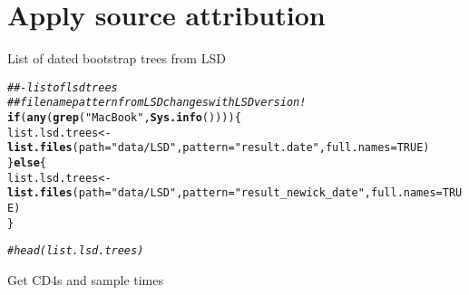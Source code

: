 \documentclass[]{revtex4}\usepackage[]{graphicx}\usepackage[]{color}
\makeatletter
\newcommand{\hlnum}[1]{\textcolor[rgb]{0.686,0.059,0.569}{#1}}%
\newcommand{\hlstr}[1]{\textcolor[rgb]{0.192,0.494,0.8}{#1}}%
\newcommand{\hlcom}[1]{\textcolor[rgb]{0.678,0.584,0.686}{\textit{#1}}}%
\newcommand{\hlstd}[1]{\textcolor[rgb]{0.345,0.345,0.345}{#1}}%
\newcommand{\hlkwa}[1]{\textcolor[rgb]{0.161,0.373,0.58}{\textbf{#1}}}%
\newcommand{\hlkwb}[1]{\textcolor[rgb]{0.69,0.353,0.396}{#1}}%
\newcommand{\hlkwc}[1]{\textcolor[rgb]{0.333,0.667,0.333}{#1}}%
\newcommand{\hlkwd}[1]{\textcolor[rgb]{0.737,0.353,0.396}{\textbf{#1}}}%
\newenvironment{kframe}{%
 \def\at@end@of@kframe{}%
 \ifinner\ifhmode%
  \def\at@end@of@kframe{\end{minipage}}%
  \begin{minipage}{\columnwidth}%
 \fi\fi%
 \def\FrameCommand##1{\hskip\@totalleftmargin \hskip-\fboxsep
 \colorbox{shadecolor}{##1}\hskip-\fboxsep
     \hskip-\linewidth \hskip-\@totalleftmargin \hskip\columnwidth}%
 \MakeFramed {\advance\hsize-\width
   \@totalleftmargin\z@ \linewidth\hsize
   \@setminipage}}%
 {\par\unskip\endMakeFramed%
 \at@end@of@kframe}
\newenvironment{knitrout}{}{} %
\makeatother
\begin{document}
\section*{Apply source attribution}
List of dated bootstrap trees from LSD
\begin{knitrout}
\color{fgcolor}\begin{kframe}
\begin{alltt}
 \hlcom{##- list of lsd trees}
 \hlcom{## filename pattern from LSD changes with LSD version !}
 \hlkwa{if}\hlstd{(} \hlkwd{any}\hlstd{(}\hlkwd{grep}\hlstd{(}\hlstr{"MacBook"}\hlstd{,} \hlkwd{Sys.info}\hlstd{())) )\{}
 \hlstd{list.lsd.trees} \hlkwb{<-} \hlkwd{list.files}\hlstd{(}\hlkwc{path} \hlstd{=} \hlstr{"data/LSD"}\hlstd{,} \hlkwc{pattern} \hlstd{=} \hlstr{"result.date"}\hlstd{,} \hlkwc{full.names} \hlstd{=} \hlnum{TRUE}\hlstd{)}
 \hlstd{\}} \hlkwa{else} \hlstd{\{}
 \hlstd{list.lsd.trees} \hlkwb{<-} \hlkwd{list.files}\hlstd{(}\hlkwc{path} \hlstd{=} \hlstr{"data/LSD"}\hlstd{,} \hlkwc{pattern} \hlstd{=} \hlstr{"result_newick_date"}\hlstd{,} \hlkwc{full.names} \hlstd{=} \hlnum{TRUE}\hlstd{)}
 \hlstd{\}}

\hlcom{# head(list.lsd.trees)}
\end{alltt}
\end{kframe}
\end{knitrout}
Get CD4s and sample times
\end{document}
